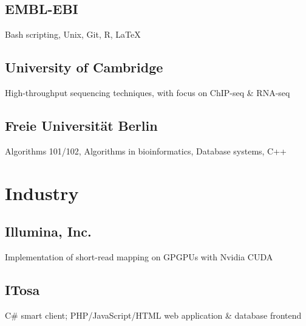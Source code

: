 \documentclass{klmr-cv}
\newcommand*\csharp{C\#}
\newcommand*\cpp{C++}
\begin{document}
\subsection{EMBL-EBI}

\date{2011--2015}
\item{}
\item{Bash scripting, Unix, Git, R, \LaTeX}

\subsection{University of Cambridge}

\date{2013--2015}
\item{}
\item{High-throughput sequencing techniques, with focus on ChIP-seq \& RNA-seq}

\subsection{Freie Universität Berlin}

\date{2008--2011}
\item{}
\item{Algorithms 101/102, Algorithms in bioinformatics, Database systems, \cpp}

\section{Industry}

\subsection{Illumina, Inc.}

\date{Oct 2008--Feb 2009}
\item{}
\item{Implementation of short-read mapping on GPGPUs with Nvidia CUDA}

\subsection{ITosa}

\date{Jan 2007--Jan 2008}
\item{}
\item{\csharp{} smart client; PHP/JavaScript/HTML web application \& database
    frontend}
\end{document}
